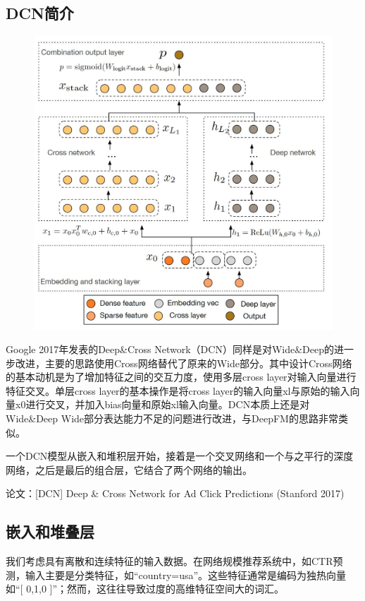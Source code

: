 \documentclass[12pt]{article}
\begin{document}
\subsection{DCN简介}
\begin{figure}[H]
    \centering
    \includegraphics[width=.8\textwidth]{fig/Google_Deep_Cross_Network_Structure.jpg}
\end{figure}

Google 2017年发表的Deep\&Cross Network（DCN）同样是对Wide\&Deep的进一步改进，主要的思路使用Cross网络替代了原来的Wide部分。其中设计Cross网络的基本动机是为了增加特征之间的交互力度，使用多层cross layer对输入向量进行特征交叉。单层cross layer的基本操作是将cross layer的输入向量xl与原始的输入向量x0进行交叉，并加入bias向量和原始xl输入向量。DCN本质上还是对Wide\&Deep Wide部分表达能力不足的问题进行改进，与DeepFM的思路非常类似。

一个DCN模型从嵌入和堆积层开始，接着是一个交叉网络和一个与之平行的深度网络，之后是最后的组合层，它结合了两个网络的输出\cite{Recommender_System_With_Deep_Learning_DCN}。

论文：[DCN] Deep \& Cross Network for Ad Click Predictions (Stanford 2017)

\subsection{嵌入和堆叠层}
我们考虑具有离散和连续特征的输入数据。在网络规模推荐系统中，如CTR预测，输入主要是分类特征，如“country=usa”。这些特征通常是编码为独热向量如“[ 0,1,0 ]”；然而，这往往导致过度的高维特征空间大的词汇。
\end{document}
